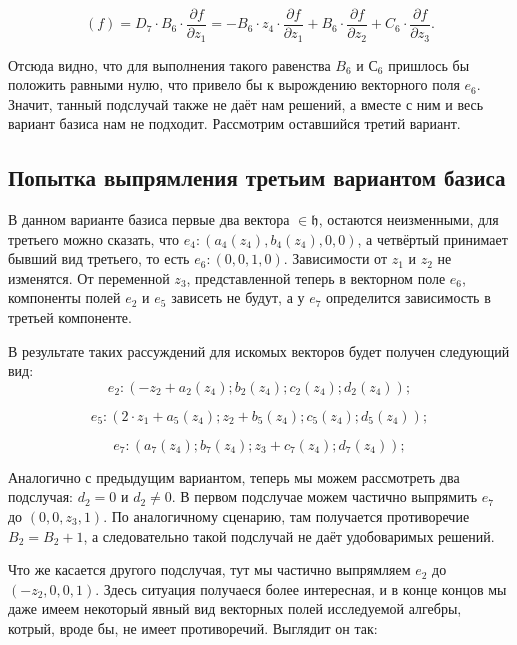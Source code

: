 \documentclass{article}
\begin{document}
\begin{equation}
        [e_{6}, e_{7}](f) = D_{7} \cdot B_{6} \cdot \frac{\partial f}{\partial z_{1}} = - B_{6} \cdot z_{4} \cdot \frac{\partial f}{\partial z_{1}} + B_{6} \cdot \frac{\partial f}{\partial z_{2}} + C_{6} \cdot \frac{\partial f}{\partial z_{3}}.
\end{equation}

Отсюда видно, что для выполнения такого равенства $B_{6}$ и $С_{6}$ пришлось бы положить равными нулю, что привело бы к вырождению векторного поля $e_{6}$. Значит, танный подслучай также не даёт нам решений, а вместе с ним и весь вариант базиса нам не подходит. Рассмотрим оставшийся третий вариант.

\subsection{Попытка выпрямления третьим вариантом базиса}
В данном варианте базиса первые два вектора $\in \mathfrak{h}$, остаются неизменными, для третьего можно сказать, что $e_{4}:(a_{4}(z_{4}), b_{4}(z_{4}), 0, 0)$, а четвёртый принимает бывший вид третьего, то есть $e_{6}:(0,0,1,0)$. Зависимости от $z_{1}$ и $z_{2}$ не изменятся. От переменной $z_{3}$, представленной теперь в векторном поле $e_{6}$, компоненты полей $e_{2}$ и $e_{5}$ зависеть не будут, а у $e_{7}$ определится зависимость в третьей компоненте.

В результате таких рассуждений для искомых векторов будет получен следующий вид:
\begin{equation}
e_{2}:(-z_{2} + a_{2}(z_{4}) ; b_{2}(z_{4}) ; c_{2}(z_{4}) ; d_{2}(z_{4}));
\end{equation}

\begin{equation}
e_{5}:(2\cdot z_{1} + a_{5}(z_{4}) ; z_{2} + b_{5}(z_{4}) ; c_{5}(z_{4}) ; d_{5}(z_{4}));
\end{equation}

\begin{equation}
e_{7}:( a_{7}(z_{4}) ; b_{7}(z_{4}) ; z_{3} + c_{7}(z_{4}) ; d_{7}(z_{4}));
\end{equation}

Аналогично с предыдущим вариантом, теперь мы можем рассмотреть два подслучая: $d_{2}=0$ и $d_{2}\neq 0$. В первом подслучае можем частично выпрямить $e_{7}$ до $(0,0,z_{3},1)$. По аналогичному сценарию, там получается противоречие $B_{2}=B_{2}+1$, а следовательно такой подслучай не даёт удобоваримых решений.

Что же касается другого подслучая, тут мы частично выпрямляем $e_{2}$ до $(-z_{2},0,0,1)$. Здесь ситуация получаеся более интересная, и в конце концов мы даже имеем некоторый явный вид векторных полей исследуемой алгебры, котрый, вроде бы, не имеет противоречий. Выглядит он так:
\end{document}
